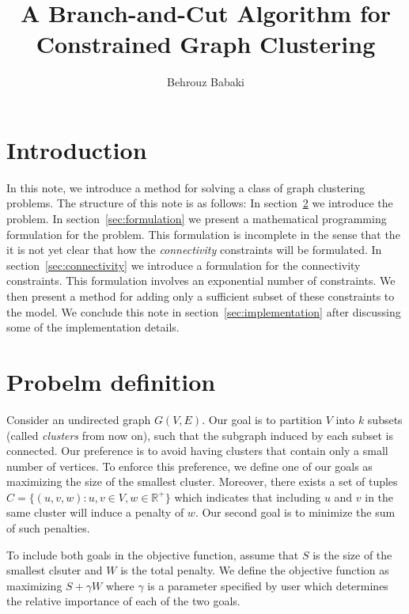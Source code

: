 \documentclass[]{article}
\begin{document}
\title{A Branch-and-Cut Algorithm for Constrained Graph Clustering}
\author{Behrouz Babaki}
\date{}
\maketitle

\section{Introduction}
\label{introduction}

In this note, we introduce a method for solving a class of graph
clustering problems. The structure of this note is as follows: In
section~\ref{sec:definition} we introduce the problem. In
section~\ref{sec:formulation} we present a mathematical programming
formulation for the problem. This formulation is incomplete in the
sense that the it is not yet clear that how the \emph{connectivity}
constraints will be formulated. In section~\ref{sec:connectivity} we
introduce a formulation for the connectivity constraints. This
formulation involves an exponential number of constraints. We then
present a method for adding only a sufficient subset of these
constraints to the model. We conclude this note in section~\ref{sec:implementation} after 
discussing some of the implementation details.

\section{Probelm definition}
\label{sec:definition}

Consider an undirected graph $G(V, E)$. Our goal is to partition $V$
into $k$ subsets (called \emph{clusters} from now on), such that the
subgraph induced by each subset is connected. Our preference is to avoid
having clusters that contain only a small number of vertices. To enforce
this preference, we define one of our goals as maximizing the size of
the smallest cluster. Moreover, there exists a set of tuples
$C = \{(u, v, w): u, v \in V, w \in \mathbb{R}^+\}$ which indicates that
including $u$ and $v$ in the same cluster will induce a penalty of $w$.
Our second goal is to minimize the sum of such penalties.

To include both goals in the objective function, assume that $S$ is the
size of the smallest clsuter and $W$ is the total penalty. We define the
objective function as maximizing $S + \gamma W$ where $\gamma$ is a
parameter specified by user which determines the relative importance of
each of the two goals.
\end{document}
